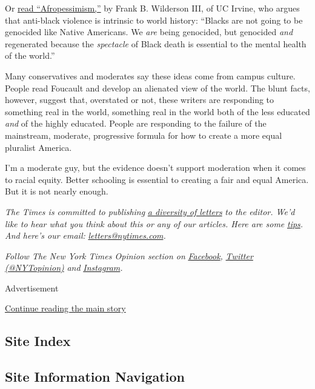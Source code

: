 Or \href{https://wwnorton.com/books/9781631496141}{read
``Afropessimism,''} by Frank B. Wilderson III, of UC Irvine, who argues
that anti-black violence is intrinsic to world history: ``Blacks are not
going to be genocided like Native Americans. We \emph{are} being
genocided, but genocided \emph{and} regenerated because the
\emph{spectacle} of Black death is essential to the mental health of the
world.''

Many conservatives and moderates say these ideas come from campus
culture. People read Foucault and develop an alienated view of the
world. The blunt facts, however, suggest that, overstated or not, these
writers are responding to something real in the world, something real in
the world both of the less educated \emph{and} of the highly educated.
People are responding to the failure of the mainstream, moderate,
progressive formula for how to create a more equal pluralist America.

I'm a moderate guy, but the evidence doesn't support moderation when it
comes to racial equity. Better schooling is essential to creating a fair
and equal America. But it is not nearly enough.

\emph{The Times is committed to publishing}
\href{https://www.nytimes.com/2019/01/31/opinion/letters/letters-to-editor-new-york-times-women.html}{\emph{a
diversity of letters}} \emph{to the editor. We'd like to hear what you
think about this or any of our articles. Here are some}
\href{https://help.nytimes.com/hc/en-us/articles/115014925288-How-to-submit-a-letter-to-the-editor}{\emph{tips}}\emph{.
And here's our email:}
\href{mailto:letters@nytimes.com}{\emph{letters@nytimes.com}}\emph{.}

\emph{Follow The New York Times Opinion section on}
\href{https://www.facebook.com/nytopinion}{\emph{Facebook}}\emph{,}
\href{http://twitter.com/NYTOpinion}{\emph{Twitter (@NYTopinion)}}
\emph{and}
\href{https://www.instagram.com/nytopinion/}{\emph{Instagram}}\emph{.}

Advertisement

\protect\hyperlink{after-bottom}{Continue reading the main story}

\hypertarget{site-index}{%
\subsection{Site Index}\label{site-index}}

\hypertarget{site-information-navigation}{%
\subsection{Site Information
Navigation}\label{site-information-navigation}}

